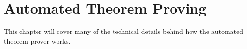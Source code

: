 \chapter{Automated Theorem Proving}

This chapter will cover many of the technical details behind how the
automated theorem prover works.




